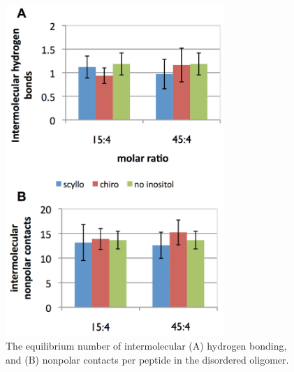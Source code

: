 \begin{figure}[ht]
\centering
\includegraphics[width=8.25cm]{figures/appendixA/inos2_figures_SI_disorderedNumContacts.pdf}
\caption{The equilibrium number of intermolecular (A) hydrogen bonding, and (B) nonpolar contacts per peptide in the disordered oligomer.}
\label{fig:SI-disorderedNumContacts}
\end{figure}

